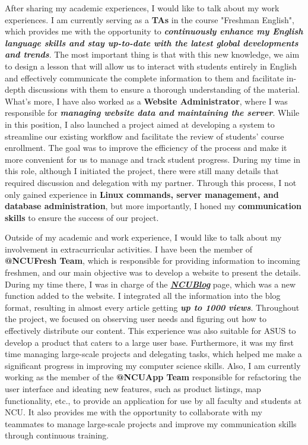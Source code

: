 After sharing my academic experiences, I would like to talk about my work experiences.
I am currently serving as a \textbf{TAs} in the course "Freshman English", which provides me with the opportunity to \textbf{\textit{continuously enhance my English language skills and stay up-to-date with the latest global developments and trends}}. The most important thing is that with this new knowledge, we aim to design a lesson that will allow us to interact with students entirely in English and effectively communicate the complete information to them and facilitate in-depth discussions with them to ensure a thorough understanding of the material. 
What's more, I have also worked as a \textbf{Website Administrator}, where I was responsible for \textbf{\textit{managing website data and maintaining the server}}. While in this position, 
I also launched a project aimed at developing a system to streamline our existing workflow and facilitate the review of students' course enrollment. The goal was to improve the efficiency of the process and make it more convenient for us to manage and track student progress. 
During my time in this role, although I initiated the project, there were still many details that required discussion and delegation with my partner. Through this process, I not only gained experience in\textbf{ Linux commands, server management, and database administration}, but more importantly, I honed my \textbf{communication skills} to ensure the success of our project.

Outside of my academic and work experience, I would like to talk about my involvement in extracurricular activities. I have been the member of \textbf{@NCUFresh Team}, which is responsible for providing information to incoming freshmen, and our main objective was to develop a website to present the details. During my time there, I was in charge of the \textbf{\textit{\href{https://ncufresh22tmp.le37.tw/blog/}{NCUBlog}}} page, which was a new function added to the website. I integrated all the information into the blog format, resulting in almost every article getting \textit{\textbf{up to 1000 views}}. Throughout the project, we focused on observing user needs and figuring out how to effectively distribute our content. This experience was also suitable for ASUS to develop a product that caters to a large user base. Furthermore, it was my first time managing large-scale projects and delegating tasks, which helped me make a significant progress in improving my computer science skills. Also, I am currently working as the member of the \textbf{@NCUApp Team} responsible for refactoring the user interface and ideating new features, such as product listings, map functionality, etc., to provide an application for use by all faculty and students at NCU. It also provides me with the opportunity to collaborate with my teammates to manage large-scale projects and improve my communication skills through continuous training.


